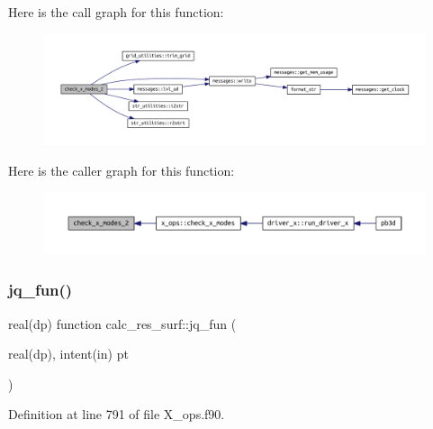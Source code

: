Here is the call graph for this function\+:
\nopagebreak
\begin{figure}[H]
\begin{center}
\leavevmode
\includegraphics[width=350pt]{X__ops_8f90_a9fba21ce7e69eeb679c06ac453ed41ce_cgraph}
\end{center}
\end{figure}
Here is the caller graph for this function\+:
\nopagebreak
\begin{figure}[H]
\begin{center}
\leavevmode
\includegraphics[width=350pt]{X__ops_8f90_a9fba21ce7e69eeb679c06ac453ed41ce_icgraph}
\end{center}
\end{figure}
\mbox{\label{X__ops_8f90_afba7acbd6df586741b0375f1d699574f}} 
\subsubsection{\texorpdfstring{jq\+\_\+fun()}{jq\_fun()}}
{\footnotesize\ttfamily real(dp) function calc\+\_\+res\+\_\+surf\+::jq\+\_\+fun (\begin{DoxyParamCaption}\item[{real(dp), intent(in)}]{pt }\end{DoxyParamCaption})}



Definition at line 791 of file X\+\_\+ops.\+f90.

